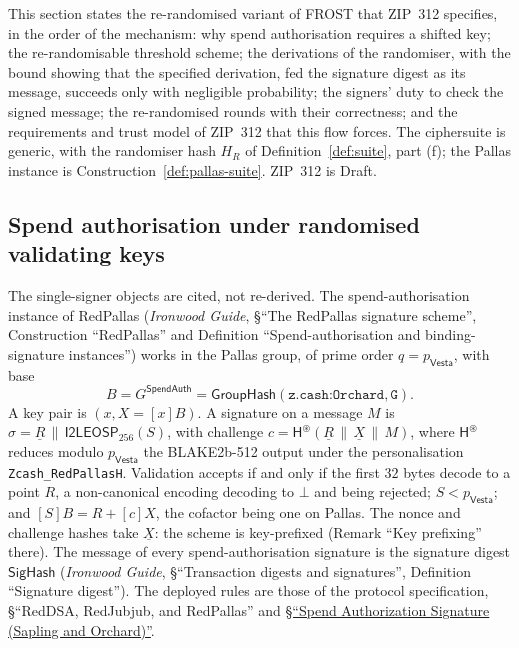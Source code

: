 \documentclass[11pt,a4paper]{article}
\theoremstyle{definition}
\newcommand{\Vesta}{\ensuremath{\mathsf{Vesta}}}
\newcommand{\GroupHash}{\ensuremath{\mathsf{GroupHash}}}
\begin{document}
This section states the re-randomised variant of FROST that ZIP~312
specifies, in the order of the mechanism: why spend authorisation requires a
shifted key; the re-randomisable threshold scheme; the derivations of the
randomiser, with the bound showing that the specified derivation, fed the
signature digest as its message, succeeds only with negligible probability;
the signers' duty to check the signed message; the re-randomised rounds with
their correctness; and the requirements and trust model of ZIP~312 that this
flow forces. The ciphersuite is generic, with the randomiser hash \(H_R\) of
Definition~\ref{def:suite}, part (f); the Pallas instance is
Construction~\ref{def:pallas-suite}. ZIP~312 is Draft.

\subsection{Spend authorisation under randomised validating keys}
\label{sec:rr-spendauth}

The single-signer objects are cited, not re-derived. The
spend-authorisation instance of RedPallas (\emph{Ironwood Guide}, \S``The
RedPallas signature scheme'', Construction ``RedPallas'' and Definition
``Spend-authorisation and binding-signature instances'') works in the Pallas
group, of prime order \(q = p_{\Vesta}\), with base
\[
  B = G^{\mathsf{SpendAuth}} = \GroupHash(\texttt{z.cash:Orchard},
  \texttt{G}) .
\]
A key pair is \((x, X = [x]B)\). A signature on a message \(M\) is
\(\sigma = \underline{R} \,\|\, \mathsf{I2LEOSP}_{256}(S)\), with challenge
\(c = \mathsf{H}^{\circledast}(\underline{R} \,\|\, \underline{X} \,\|\,
M)\), where \(\mathsf{H}^{\circledast}\) reduces modulo \(p_{\Vesta}\) the
BLAKE2b-512 output under the personalisation \texttt{Zcash\_RedPallasH}.
Validation accepts if and only if the first \(32\) bytes decode to a point
\(R\), a non-canonical encoding decoding to \(\bot\) and being rejected;
\(S < p_{\Vesta}\); and \([S]B = R + [c]X\), the cofactor being one on
Pallas. The nonce and challenge hashes take \(\underline{X}\): the scheme is
key-prefixed (Remark ``Key prefixing'' there). The message of every
spend-authorisation signature is the signature digest \(\mathsf{SigHash}\)
(\emph{Ironwood Guide}, \S``Transaction digests and signatures'', Definition
``Signature digest''). The deployed rules are those of the protocol
specification, \S``RedDSA, RedJubjub, and RedPallas'' and
\href{https://zips.z.cash/protocol/protocol.pdf\#concretespendauthsig}%
{\S``Spend Authorization Signature (Sapling and Orchard)''}.
\end{document}
